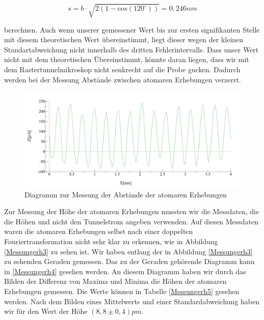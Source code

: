 \documentclass[10pt,a4paper]{article}
\begin{document}
\begin{equation}
	s = b \cdot \sqrt{2(1-cos(120^\circ))} = 0,246 nm
\end{equation}

berechnen. Auch wenn unserer gemessener Wert bis zur ersten signifikanten Stelle mit diesem theoretischen Wert übereinstimmt, liegt dieser wegen der kleinen Standartabweichung nicht innerhalb des dritten Fehlerintervalls. Dass unser Wert nicht mit dem theoretischen Übereinstimmt, könnte daran liegen, dass wir mit dem Rastertunnelmikroskop nicht senkrecht auf die Probe gucken. Dadurch werden bei der Messung Abstände zwischen atomaren Erhebungen verzerrt.

\begin{figure}[h]
	\centering
	
	\includegraphics[scale = 0.3]{Aufnahme_Ebene_doppelte_fourier.png}
	
	\caption{Diagramm zur Messung der Abstände der atomaren Erhebungen}
	\label{Messungerh2}
\end{figure}

Zur Messung der Höhe der atomaren Erhebungen mussten wir die Messdaten, die die Höhen und nicht den Tunnelstrom angeben verwenden. Auf diesen Messdaten waren die atomaren Erhebungen selbst nach einer doppelten Fouriertransformation nicht sehr klar zu erkennen, wie in Abbildung \ref{Messungerh3} zu sehen ist. Wir haben entlang der in Abbildung \ref{Messungerh3} zu sehenden Geraden gemessen. Das zu der Geraden gehörende Diagramm kann in \ref{Messungerh4} gesehen werden. An diesem Diagramm haben wir durch das Bilden der Differenz von Maxima und Minima die Höhen der atomaren Erhebungen gemessen. Die Werte können in Tabelle \ref{Messungerh5} gesehen werden. Nach dem Bilden eines Mittelwerts und einer Standardabweichung haben wir für den Wert der Höhe $(8,8 \pm 0,4) pm$.
\end{document}
